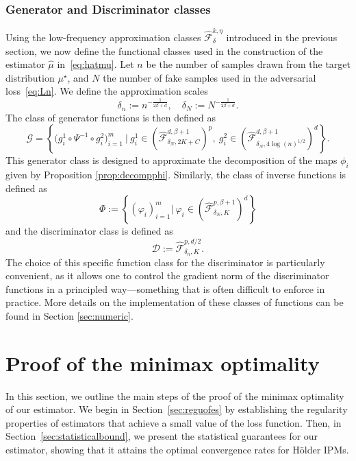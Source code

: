 \documentclass[10pt]{article}
\begin{document}
\subsubsection{Generator and Discriminator classes}\label{sec:genedis}
Using the low-frequency approximation classes \( \hat{\mathcal{F}}_\delta^{k,\eta} \) introduced in the previous section, we now define the functional classes used in the construction of the estimator \( \hat{\mu} \) in~\eqref{eq:hatmu}. Let \( n \) be the number of samples drawn from the target distribution \( \mu^\star \), and \( N \) the number of fake samples used in the adversarial loss~\eqref{eq:Ln}. We define the approximation scales
\[
\delta_n := n^{-\frac{1}{2\beta + d}}, \quad \delta_N := N^{-\frac{1}{2\beta + d}}.
\]
The class of generator functions is then defined as
\begin{equation}\label{eq:classofgene}
    \mathcal{G} = \left\{\big(g_i^1\circ \Psi^{-1}\circ g_i^2\big)_{i=1}^m\ \Big|\ g_i^1\in \left(\hat{\mathcal{F}}_{\delta_N,2K+C}^{d,\beta+1}\right)^{p},\ g_i^2\in\left(\hat{\mathcal{F}}_{\delta_N,4\log(n)^{1/2}}^{d,\beta+1}\right)^{d}\right\}.
\end{equation}
This generator class is designed to approximate the decomposition of the maps $\phi_i$ given by Proposition \ref{prop:decompphi}. Similarly, the class of inverse functions  is  defined as
\begin{equation}\label{eq:classeofinv}
     \Phi:= \left\{(\varphi_i)_{i=1}^m \big|\  \varphi_i \in \left(\hat{\mathcal{F}}_{\delta_N,K}^{p,\beta+1}\right)^{d}\right\}
\end{equation}
and the discriminator class is defined as
\begin{equation}\label{eq:classesofdis}
     \mathcal{D}:= \hat{\mathcal{F}}_{\delta_n,K}^{p,d/2}.
\end{equation}
The choice of this specific function class for the discriminator is particularly convenient, as it allows one to control the gradient norm of the discriminator functions in a principled way—something that is often difficult to enforce in practice. More details on the implementation of these classes of functions can be found in Section \ref{sec:numeric}.

\section{Proof of the minimax optimality }
In this section, we outline the main steps of the proof of the minimax optimality of our estimator. We begin in Section~\ref{sec:reguofes} by establishing the regularity properties of estimators that achieve a small value of the loss function. Then, in Section~\ref{sec:statisticalbound}, we present the statistical guarantees for our estimator, showing that it attains the optimal convergence rates for Hölder IPMs.
\end{document}
